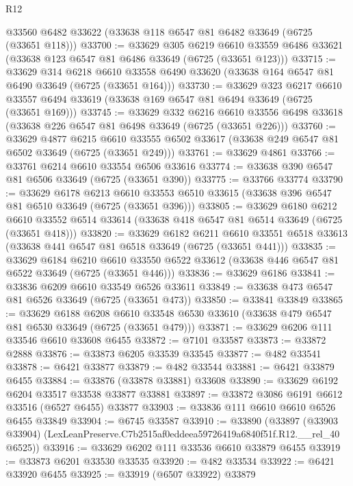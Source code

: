 \begin{lexlean}{R12}
\begin{coremodule}
    @33560
    @6482
    @33622
    (@33638 @118 @6547 @81 @6482 @33649 (@6725 (@33651 @118)))
@33700 := @33629
    @305
    @6219
    @6610
    @33559
    @6486
    @33621
    (@33638 @123 @6547 @81 @6486 @33649 (@6725 (@33651 @123)))
@33715 := @33629
    @314
    @6218
    @6610
    @33558
    @6490
    @33620
    (@33638 @164 @6547 @81 @6490 @33649 (@6725 (@33651 @164)))
@33730 := @33629
    @323
    @6217
    @6610
    @33557
    @6494
    @33619
    (@33638 @169 @6547 @81 @6494 @33649 (@6725 (@33651 @169)))
@33745 := @33629
    @332
    @6216
    @6610
    @33556
    @6498
    @33618
    (@33638 @226 @6547 @81 @6498 @33649 (@6725 (@33651 @226)))
@33760 := @33629
    @4877
    @6215
    @6610
    @33555
    @6502
    @33617
    (@33638 @249 @6547 @81 @6502 @33649 (@6725 (@33651 @249)))
@33761 := @33629 @4861
@33766 := @33761 @6214 @6610 @33554 @6506 @33616
@33774 := @33638 @390 @6547 @81 @6506 @33649 (@6725 (@33651 @390))
@33775 := @33766 @33774
@33790 := @33629
    @6178
    @6213
    @6610
    @33553
    @6510
    @33615
    (@33638 @396 @6547 @81 @6510 @33649 (@6725 (@33651 @396)))
@33805 := @33629
    @6180
    @6212
    @6610
    @33552
    @6514
    @33614
    (@33638 @418 @6547 @81 @6514 @33649 (@6725 (@33651 @418)))
@33820 := @33629
    @6182
    @6211
    @6610
    @33551
    @6518
    @33613
    (@33638 @441 @6547 @81 @6518 @33649 (@6725 (@33651 @441)))
@33835 := @33629
    @6184
    @6210
    @6610
    @33550
    @6522
    @33612
    (@33638 @446 @6547 @81 @6522 @33649 (@6725 (@33651 @446)))
@33836 := @33629 @6186
@33841 := @33836 @6209 @6610 @33549 @6526 @33611
@33849 := @33638 @473 @6547 @81 @6526 @33649 (@6725 (@33651 @473))
@33850 := @33841 @33849
@33865 := @33629
    @6188
    @6208
    @6610
    @33548
    @6530
    @33610
    (@33638 @479 @6547 @81 @6530 @33649 (@6725 (@33651 @479)))
@33871 := @33629 @6206 @111 @33546 @6610 @33608 @6455
@33872 := @7101 @33587
@33873 := @33872 @2888
@33876 := @33873 @6205 @33539 @33545
@33877 := @482 @33541
@33878 := @6421 @33877
@33879 := @482 @33544
@33881 := @6421 @33879 @6455
@33884 := @33876 (@33878 @33881) @33608
@33890 := @33629 @6192 @6204 @33517 @33538 @33877 @33881
@33897 := @33872 @3086 @6191 @6612 @33516 (@6527 @6455) @33877
@33903 := @33836 @111 @6610 @6610 @6526 @6455 @33849
@33904 := @6745 @33587
@33910 := @33890
    (@33897 (@33903 @33904) (LexLeanPreserve.C7b2515af0eddeea59726419a6840f51f.R12.__rel_40 @6525))
@33916 := @33629 @6202 @111 @33536 @6610 @33879 @6455
@33919 := @33873 @6201 @33530 @33535
@33920 := @482 @33534
@33922 := @6421 @33920 @6455
@33925 := @33919 (@6507 @33922) @33879

\end{coremodule}
\end{lexlean}
